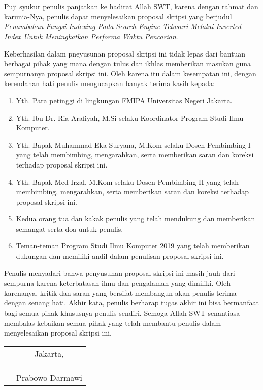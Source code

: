 \chapter*{}

Puji syukur penulis panjatkan ke hadirat Allah SWT, karena dengan rahmat dan
karunia-Nya, penulis dapat menyelesaikan proposal skripsi yang berjudul
\textit{Penambahan Fungsi Indexing Pada Search Engine Telusuri Melalui Inverted 
Index Untuk Meningkatkan Performa Waktu Pencarian}.

Keberhasilan dalam pneyusunan proposal skripsi ini tidak lepas dari bantuan
berbagai pihak yang mana dengan tulus dan ikhlas memberikan masukan guna
sempurnanya proposal skripsi ini. Oleh karena itu dalam kesempatan ini, dengan
kerendahan hati penulis mengucapkan banyak terima kasih kepada:

\begin{enumerate}

	\item{Yth. Para petinggi di lingkungan FMIPA Universitas Negeri Jakarta.}
	\item{Yth. Ibu Dr. Ria Arafiyah, M.Si selaku Koordinator Program Studi Ilmu
		Komputer.}
	\item{Yth. Bapak Muhammad Eka Suryana, M.Kom selaku Dosen Pembimbing I yang
		telah membimbing, mengarahkan, serta memberikan saran dan koreksi terhadap
		proposal skripsi ini.}
	\item{Yth. Bapak Med Irzal, M.Kom selaku Dosen Pembimbing II yang telah
		membimbing, mengarahkan, serta memberikan saran dan koreksi terhadap
		proposal skripsi ini.}
	\item{Kedua orang tua dan kakak penulis yang telah mendukung dan memberikan 
		semangat serta doa untuk penulis.}
	\item{Teman-teman Program Studi Ilmu Komputer 2019 yang telah memberikan 
		dukungan dan memiliki andil dalam penulisan proposal skripsi ini.}
	
\end{enumerate}

Penulis menyadari bahwa penyusunan proposal skripsi ini masih jauh dari sempurna
karena keterbatasan ilmu dan pengalaman yang dimiliki. Oleh karenanya, kritik
dan saran yang bersifat membangun akan penulis terima dengan senang hati. Akhir
kata, penulis berharap tugas akhir ini bisa bermanfaat bagi semua pihak
khususnya penulis sendiri. Semoga Allah SWT senantiasa membalas kebaikan semua
pihak yang telah membantu penulis dalam menyelesaikan proposal skripsi ini.

\vspace{4cm}

\begin{tabular}{p{7.5cm}c}
	&Jakarta, \\
	&\\
	&\\
	&\\
	&Prabowo Darmawi
\end{tabular}

